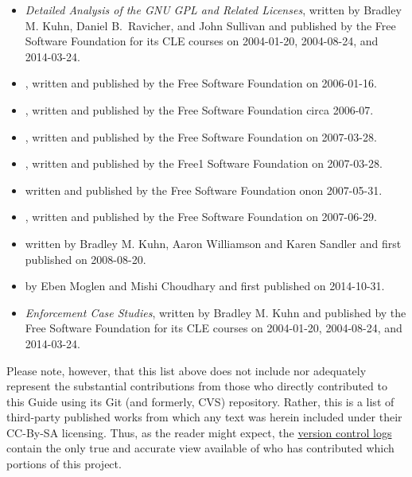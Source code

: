 \begin{itemize}
\item \textit{Detailed Analysis of the GNU GPL and Related Licenses}, written by
Bradley M. Kuhn, Daniel B.~Ravicher, and John Sullivan and published by the Free Software Foundation for its CLE courses on 2004-01-20,
2004-08-24, and 2014-03-24.
\item {}, written and published by the Free
  Software Foundation on 2006-01-16.
\item {}, written and published by the Free
  Software Foundation circa 2006-07.
\item {}, written and published by the Free
  Software Foundation on   2007-03-28.
\item {}, written and published by the Free1 Software Foundation on   2007-03-28.
\item {} written and published by the Free
  Software Foundation onon 2007-05-31.
\item {}, written and published by the Free
  Software Foundation on 2007-06-29.
\item {} written by Bradley M. Kuhn, Aaron
Williamson and Karen Sandler and first published on 2008-08-20.
\item {} by Eben Moglen and Mishi Choudhary and first published on 2014-10-31.
\item \textit{Enforcement Case Studies}, written by Bradley M. Kuhn and published by the Free
  Software Foundation for its CLE courses  on 2004-01-20, 2004-08-24, and 2014-03-24.
\end{itemize}

Please note, however, that this list above does not include nor adequately
represent the substantial contributions from those who directly
contributed to this Guide using its Git (and formerly, CVS) repository.
Rather, this is a list of third-party published works from which any text was
herein included under their CC-By-SA licensing.  Thus, as the reader might
expect, the
\href{https://gitorious.org/copyleft-org/tutorial/history/master}{version
  control logs} contain the only true and accurate view available of who has
contributed which portions of this project.
